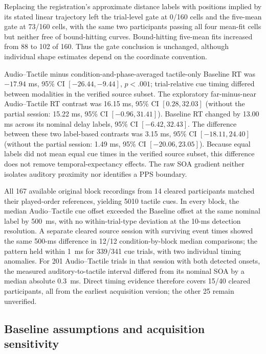 Replacing the registration's approximate distance labels with positions implied by its stated linear trajectory left the trial-level gate at 0/160 cells and the five-mean gate at 73/160 cells, with the same two participants passing all four mean-fit cells but neither free of bound-hitting curves. Bound-hitting five-mean fits increased from 88 to 102 of 160. Thus the gate conclusion is unchanged, although individual shape estimates depend on the coordinate convention.

Audio--Tactile minus condition-and-phase-averaged tactile-only Baseline RT was $-17.94$ ms, 95\% CI $[-26.44, -9.44]$, $p<.001$; trial-relative cue timing differed between modalities in the verified source subset. The exploratory far-minus-near Audio--Tactile RT contrast was 16.15 ms, 95\% CI $[0.28, 32.03]$ (without the partial session: 15.22 ms, 95\% CI $[-0.96, 31.41]$). Baseline RT changed by 13.00 ms across its nominal delay labels, 95\% CI $[-6.42, 32.43]$. The difference between these two label-based contrasts was 3.15 ms, 95\% CI $[-18.11, 24.40]$ (without the partial session: 1.49 ms, 95\% CI $[-20.06, 23.05]$). Because equal labels did not mean equal cue times in the verified source subset, this difference does not remove temporal-expectancy effects. The raw SOA gradient neither isolates auditory proximity nor identifies a PPS boundary.

All 167 available original block recordings from 14 cleared participants matched their played-order references, yielding 5010 tactile cues. In every block, the median Audio--Tactile cue offset exceeded the Baseline offset at the same nominal label by 500~ms, with no within-trial-type deviation at the 10-ms detection resolution. A separate cleared source session with surviving event times showed the same 500-ms difference in 12/12 condition-by-block median comparisons; the pattern held within 1~ms for 339/341 cue trials, with two individual timing anomalies. For 201 Audio--Tactile trials in that session with both detected onsets, the measured auditory-to-tactile interval differed from its nominal SOA by a median absolute 0.3~ms. Direct timing evidence therefore covers 15/40 cleared participants, all from the earliest acquisition version; the other 25 remain unverified.

\subsection{Baseline assumptions and acquisition sensitivity}

